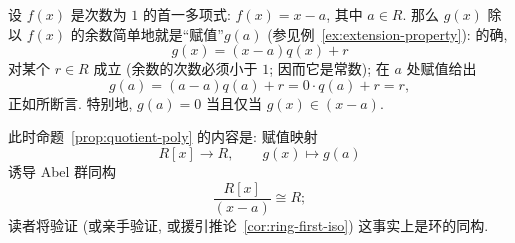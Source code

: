 \begin{example}
\label{ex:linear-monic}
设 $f(x)$ 是次数为 $1$ 的首一多项式: $f(x) = x - a$, 其中 $a \in R$. 那么 $g(x)$ 除以 $f(x)$ 的余数简单地就是``赋值''$g(a)$ (参见例~\ref{ex:extension-property}): 的确,
\[
g(x) = (x - a)q(x) + r
\]
对某个 $r \in R$ 成立 (余数的次数必须小于 $1$; 因而它是常数); 在 $a$ 处赋值给出
\[
g(a) = (a - a)q(a) + r = 0 \cdot q(a) + r = r,
\]
正如所断言. 特别地, $g(a) = 0$ 当且仅当 $g(x) \in (x - a)$.

此时命题~\ref{prop:quotient-poly} 的内容是: 赋值映射
\[
R[x] \rightarrow R, \qquad g(x) \mapsto g(a)
\]
诱导 Abel 群同构
\[
\frac{R[x]}{(x - a)} \cong R;
\]
读者将验证 (或亲手验证, 或援引推论~\ref{cor:ring-first-iso}) 这事实上是环的同构.
\end{example}

